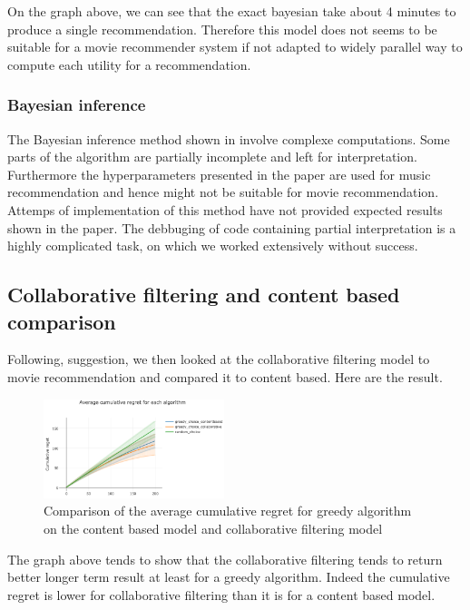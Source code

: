 \documentclass[letterpaper]{article}
\begin{document}
On the graph above, we can see that the exact bayesian take about 4 minutes to produce a single recommendation. Therefore this model does not seems to be suitable for a movie recommender system if not adapted to widely parallel way to compute each utility for a recommendation.

\subsubsection{Bayesian inference}

The Bayesian inference method shown in \citep{main} involve complexe computations. Some parts of the algorithm are partially incomplete and left for interpretation. Furthermore the hyperparameters presented in the paper are used for music recommendation and hence might not be suitable for movie recommendation. Attemps of implementation of this method have not provided expected results shown in the paper. The debbuging of code containing partial interpretation is a highly complicated task, on which we worked extensively without success. 

\subsection{Collaborative filtering and content based comparison}

Following, \cite{main} suggestion, we then looked at the collaborative filtering model to movie recommendation and compared it to content based. Here are the result.

\begin{figure}[H]
\begin{center}
\includegraphics[width=0.47\textwidth]{img/collabo1.png}
\caption{Comparison of the average cumulative regret for greedy algorithm on the content based model and collaborative filtering model}
\label{collabo1}
\end{center}
\end{figure}

The graph above tends to show that the collaborative filtering tends to return better longer term result at least for a greedy algorithm. Indeed the cumulative regret is lower for collaborative filtering than it is for a content based model.
\end{document}
